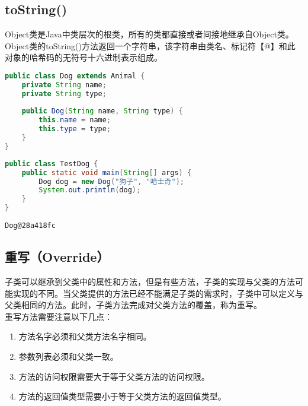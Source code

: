 \subsection{toString()}

Object类是Java中类层次的根类，所有的类都直接或者间接地继承自Object类。Object类的toString()方法返回一个字符串，该字符串由类名、标记符【@】和此对象的哈希码的无符号十六进制表示组成。\\


\begin{lstlisting}[language=Java, title=Dog.java]
public class Dog extends Animal {
    private String name;
    private String type;
    
    public Dog(String name, String type) {
        this.name = name;
        this.type = type;
    }   
}
\end{lstlisting}

\begin{lstlisting}[language=Java, title=TestDog.java]
public class TestDog {
    public static void main(String[] args) {
        Dog dog = new Dog("狗子", "哈士奇");
        System.out.println(dog);
    }
}
\end{lstlisting}

\begin{tcolorbox}
	\begin{verbatim}
Dog@28a418fc
	\end{verbatim}
\end{tcolorbox}

\vspace{0.5cm}

\subsection{重写（Override）}

子类可以继承到父类中的属性和方法，但是有些方法，子类的实现与父类的方法可能实现的不同。当父类提供的方法已经不能满足子类的需求时，子类中可以定义与父类相同的方法。此时，子类方法完成对父类方法的覆盖，称为重写。\\

重写方法需要注意以下几点：

\begin{enumerate}
	\item 方法名字必须和父类方法名字相同。
	\item 参数列表必须和父类一致。
	\item 方法的访问权限需要大于等于父类方法的访问权限。
	\item 方法的返回值类型需要小于等于父类方法的返回值类型。
\end{enumerate}

